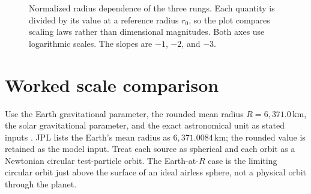 \documentclass[12pt]{article}
\begin{document}
\begin{figure}[ht]
  \centering
  \caption{Normalized radius dependence of the three rungs. Each quantity is divided by its value at a reference radius $r_0$, so the plot compares scaling laws rather than dimensional magnitudes. Both axes use logarithmic scales. The slopes are $-1$, $-2$, and $-3$.}
  \label{fig:radius-powers}
\end{figure}

\section{Worked scale comparison}
\label{sec:examples}

Use the Earth gravitational parameter, the rounded mean radius $R=6{,}371.0\,\mathrm{km}$, the solar gravitational parameter, and the exact astronomical unit as stated inputs \cite{JPLParams,JPLPhysical}. JPL lists the Earth's mean radius as $6{,}371.0084\,\mathrm{km}$; the rounded value is retained as the model input. Treat each source as spherical and each orbit as a Newtonian circular test-particle orbit. The Earth-at-$R$ case is the limiting circular orbit just above the surface of an ideal airless sphere, not a physical orbit through the planet.
\end{document}
